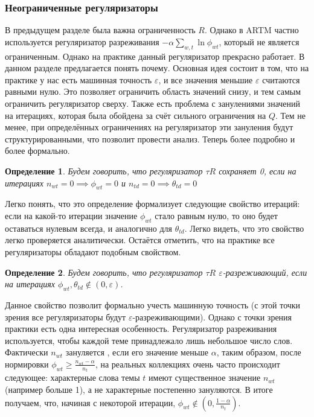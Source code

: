 \documentclass[12pt]{article}
\newtheorem{definition}{Определение}[section]
\renewcommand{\geq}{\geqslant}
\begin{document}
\subsubsection{Неограниченные регуляризаторы}
\label{subsec:unboundreg}
В предыдущем разделе была важна ограниченность $R$. Однако в ARTM частно используется регуляризатор разреживания $- \alpha \sum_{w,t}\ln \phi_{wt}$, который не является ограниченным. Однако на практике данный регуляризатор прекрасно работает. В данном разделе предлагается понять почему. Основная идея состоит в том, что на практике у нас есть машинная точность $\varepsilon$, и все значения меньшие $\varepsilon$ считаются равными нулю. Это позволяет ограничить область значений снизу, и тем самым ограничить регуляризатор сверху. Также есть проблема с занулениями значений на итерациях, которая была обойдена за счёт сильного ограничения на $Q$. Тем не менее, при определённых  ограничениях на регуляризатор эти зануления будут структурированными, что позволит провести анализ. Теперь более подробно и более формально.
\begin{definition}
Будем говорить, что регуляризатор $\tau R$ сохраняет 0, если на итерациях $n_{wt} = 0 \implies \phi_{wt} = 0$ и $n_{td} = 0 \implies \theta_{td} = 0$
\end{definition}
Легко понять, что это определение формализует следующие свойство итераций: если на какой-то итерации значение $\phi_{wt}$ стало равным нулю, то оно будет оставаться нулевым всегда, и аналогично для $\theta_{td}$. Легко видеть, что это свойство легко проверяется аналитически. Остаётся отметить, что на практике все регуляризаторы обладают подобным свойством.
\begin{definition}
Будем говорить, что регуляризатор $\tau R$ $\varepsilon$-разреживающий, если на итерациях $\phi_{wt}, \theta_{td} \notin (0, \varepsilon)$.
\end{definition}
Данное свойство позволит формально учесть машинную точность (с этой точки зрения все регуляризаторы будут $\varepsilon$-разреживающими). Однако с точки зрения практики есть одна интересная особенность. Регуляризатор разреживания используется, чтобы каждой теме принадлежало лишь небольшое число слов. Фактически  $n_{wt}$ зануляется , если его значение меньше $\alpha$, таким образом, после нормировки $\phi_{wt} \geq \frac{n_{wt} - \alpha}{n_t}$,  на реальных коллекциях очень часто происходит следующее: характерные слова темы $t$ имеют существенное значение $n_{wt}$ (например больше 1), а не характерные постепенно зануляются. В итоге получаем, что, начиная с некоторой итерации, $\phi_{wt} \notin (0, \frac{1-\alpha}{n_t})$.\\
\end{document}
